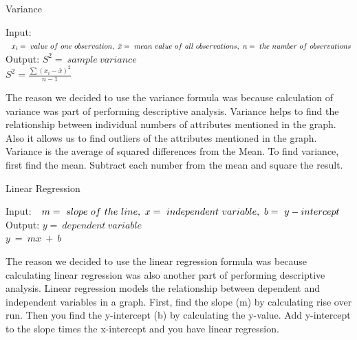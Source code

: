 \documentclass[10pt,journal,compsoc]{IEEEtran}
\begin{document}
{\SetAlgoNoLine
	\begin{algorithm} 
		\caption{Variance} %
		\label{Algo:Calculate Variance :BWLP}
		Input: $\ 
		\ x_i = \ value \ of \ one \ observation, \newline
		\ \bar{x} = \ mean \ value \ of \ all\ observations, \newline
		\ n = \ the \ number \ of \ observations
		$\\
		Output: $  S^2 = \ sample \ variance $\\
			
$ 			 	S^2 = \frac{\sum (x_i - \bar{x})^2}{n - 1} $
	\end{algorithm}

	The reason we decided to use the variance formula was because calculation of variance was part of performing descriptive analysis. Variance helps to find the relationship between individual numbers of attributes mentioned in the graph. Also it allows us to find outliers of the attributes mentioned in the graph. Variance is the average of squared differences from the Mean. To find variance, first find the mean. Subtract each number from the mean and square the result.

{\SetAlgoNoLine
	\begin{algorithm} 
		\caption{Linear Regression} %
		\label{Algo:Calculate Linear Regression :BWLP}
		Input: $\ 
		 \ m = \ slope \ of \ the \ line, \newline
 		\ x = \ independent \ variable, \newline
		\ b = \ y-intercept
		$\\
		Output: $ y = \ dependent \ variable $\\
			
$ 			 	y  \ = \ mx \ + \ b $
	\end{algorithm}

	The reason we decided to use the linear regression formula was because calculating linear regression was also another part of performing descriptive analysis. Linear regression models the relationship between dependent and independent variables in a graph. First, find the slope (m) by calculating rise over run. Then you find the y-intercept (b) by calculating the y-value. Add y-intercept to the slope times the x-intercept and you have linear regression.


}}
\end{document}
